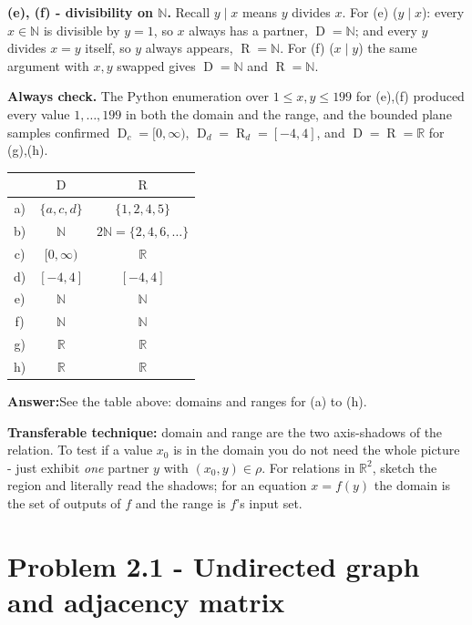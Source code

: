 \documentclass[11pt,a4paper]{article}
\newcommand{\R}{\mathbb{R}}
\newcommand{\N}{\mathbb{N}}
\DeclareMathOperator{\Dom}{D}
\DeclareMathOperator{\Ran}{R}
\newcommand{\answer}[1]{\begin{answerbox}\centering\textbf{Answer:}\quad #1\end{answerbox}}
\begin{document}
\textbf{(e), (f) - divisibility on $\N$.} Recall $y\mid x$ means $y$ divides $x$.
For (e) ($y\mid x$): every $x\in\N$ is divisible by $y=1$, so $x$ always has a partner, $\Dom=\N$;
and every $y$ divides $x=y$ itself, so $y$ always appears, $\Ran=\N$. For (f) ($x\mid y$) the same
argument with $x,y$ swapped gives $\Dom=\N$ and $\Ran=\N$.

\textbf{Always check.} The Python enumeration over $1\le x,y\le199$ for (e),(f) produced every value
$1,\dots,199$ in both the domain and the range, and the bounded plane samples confirmed
$\Dom_c=[0,\infty)$, $\Dom_d=\Ran_d=[-4,4]$, and $\Dom=\Ran=\R$ for (g),(h). \checkmark

\begin{center}
\renewcommand{\arraystretch}{1.2}
\begin{tabular}{@{}c|cc@{}}
\toprule
 & $\Dom$ & $\Ran$\\
\midrule
a) & $\{a,c,d\}$ & $\{1,2,4,5\}$\\
b) & $\N$ & $2\N=\{2,4,6,\dots\}$\\
c) & $[0,\infty)$ & $\R$\\
d) & $[-4,4]$ & $[-4,4]$\\
e) & $\N$ & $\N$\\
f) & $\N$ & $\N$\\
g) & $\R$ & $\R$\\
h) & $\R$ & $\R$\\
\bottomrule
\end{tabular}
\end{center}

\answer{See the table above: domains and ranges for (a) to (h).}

\begin{methodbox}
\textbf{Transferable technique:} domain and range are the two axis-shadows of the relation. To test
if a value $x_0$ is in the domain you do not need the whole picture - just exhibit \emph{one}
partner $y$ with $(x_0,y)\in\rho$. For relations in $\R^2$, sketch the region and literally read the
shadows; for an equation $x=f(y)$ the domain is the set of outputs of $f$ and the range is $f$'s
input set.
\end{methodbox}

\section*{Problem 2.1 - Undirected graph and adjacency matrix}
\end{document}
